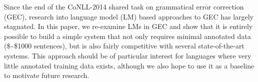Since the end of the CoNLL-2014 shared task on grammatical error correction (GEC), research into language model (LM) based approaches to GEC has largely stagnated. In this paper, we re-examine LMs in GEC and show that it is entirely possible to build a simple system that not only requires minimal annotated data (\$\sim\$1000 sentences), but is also fairly competitive with several state-of-the-art systems. This approach should be of particular interest for languages where very little annotated training data exists, although we also hope to use it as a baseline to motivate future research.
